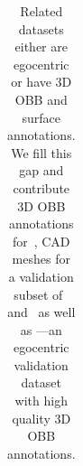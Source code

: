 \begin{table}[]
{\begin{tabular}{c|c|c|c|c|c|c|c|c|c}
    \end{tabular}
    }
    \caption{Related datasets either are egocentric or have 3D OBB and surface annotations. We fill this gap and contribute 3D OBB annotations for~\ASE{}, CAD meshes for a validation subset of~\ASE{} and~\ADT{} as well as \AOThree{}---an egocentric validation dataset with high quality 3D OBB annotations.}
    \label{tab:datasets}
    \vspace{-5mm}
\end{table}


